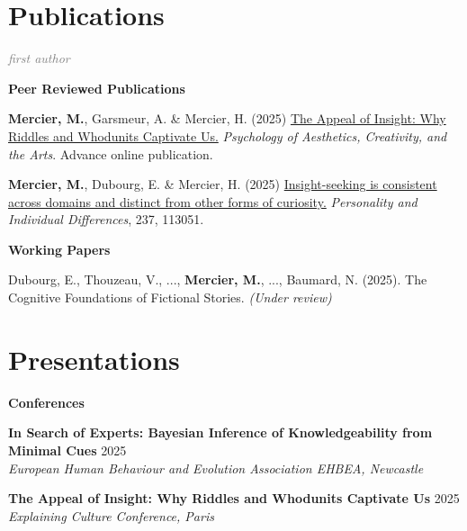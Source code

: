 \documentclass[letterpaper,11pt]{article}
\newcommand{\resumeItem}[1]{
  \item\small{
    {#1 \vspace{-2pt}}
  }
}
\newcommand{\resumeItemWithYear}[3][ ]{ %
  \item\small{
    #2 \hfill {\small #3} \\
    #1
  }
}
\newcommand{\resumePublicationHeading}[1]{
  \vspace{5pt} %
  \noindent\textbf{\small #1} %
  \vspace{2pt} %
}
\begin{document}
\section{Publications}


\small

\noindent\textcolor{gray}{\textit{\footnotemark[1]first author}}
\vspace{5pt} %

\resumePublicationHeading{Peer Reviewed Publications}
\begin{etaremune}
    \resumeItem{\textbf{Mercier, M.\footnotemark[1]}, Garsmeur, A. \& Mercier, H. (2025) \href{https://doi.org/10.1037/aca0000773}{The Appeal of Insight: Why Riddles and Whodunits Captivate Us.} \emph{Psychology of Aesthetics, Creativity, and the Arts}. Advance online publication.}
    \resumeItem{\textbf{Mercier, M.\footnotemark[1]}, Dubourg, E. \& Mercier, H. (2025) \href{https://doi.org/10.1016/j.paid.2025.113051}{Insight-seeking is consistent across domains and distinct from other forms of curiosity.} \emph{Personality and Individual Differences}, 237, 113051.}
\end{etaremune}


\resumePublicationHeading{Working Papers}
\begin{etaremune}
    \resumeItem{Dubourg, E., Thouzeau, V., ..., \textbf{Mercier, M.}, ..., Baumard, N. (2025). The Cognitive Foundations of Fictional Stories. \emph{(Under review)}
    }

\end{etaremune}


\section{Presentations}

\resumePublicationHeading{Conferences}
\begin{etaremune}
  \resumeItemWithYear{\textbf{In Search of Experts: Bayesian Inference of Knowledgeability from Minimal Cues}}{2025}{\textit{European Human Behaviour and Evolution Association EHBEA, Newcastle}}
  \resumeItemWithYear{\textbf{The Appeal of Insight: Why Riddles and Whodunits Captivate Us}}{2025}{\textit{Explaining Culture Conference, Paris}}
\end{etaremune}
\end{document}
